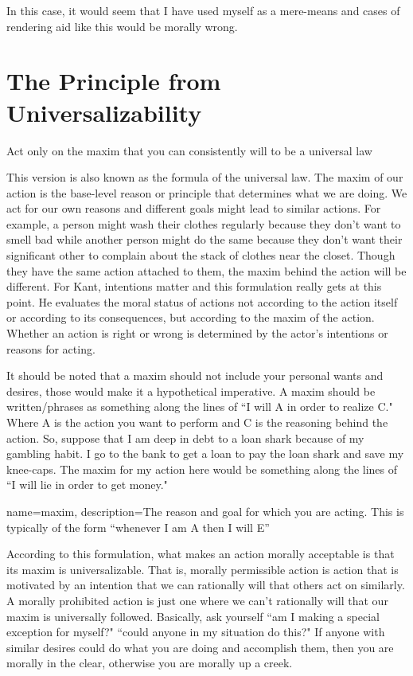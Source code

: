 In this case, it would seem that I have used myself as a mere-means and cases of rendering aid like this would be morally wrong.    
\section{The Principle from Universalizability}
\begin{center}
Act only on the maxim that you can consistently will to be a universal law
\end{center}
This version is also known as the formula of the universal law. The maxim of our action is the base-level reason or principle that determines what we are doing. We act for our own reasons and different goals might lead to similar actions. For example, a person might wash their clothes regularly because they don't want to smell bad while another person might do the same because they don't want their significant other to complain about the stack of clothes near the closet. Though they have the same action attached to them, the maxim behind the action will be different.  For Kant, intentions matter and this formulation really gets at this point. He evaluates the moral status of actions not according to the action itself or according to its consequences, but according to the maxim of the action. Whether an action is right or wrong  is determined by the actor’s intentions or reasons for acting.

It should be noted that a \gls{maxim} should not include your personal wants and desires, those would make it a hypothetical imperative. A maxim should be written/phrases as something along the lines of ``I will A in order to realize C." Where A is the action you want to perform and C is the reasoning behind the action. So, suppose that I am deep in debt to a loan shark because of my gambling habit. I go to the bank to get a loan to pay the loan shark and save my knee-caps. The maxim for my action here would be something along the lines of ``I will lie in order to get money."

{
  name=maxim,
  description={The reason and goal for which you are acting. This is typically of the form ``whenever I am A then I will E''}
}


According to this formulation, what makes an action morally acceptable is that its maxim is universalizable. That is, morally permissible action is action that is motivated by an intention that we can rationally will that others act on similarly. A morally prohibited action is just one where we can’t rationally will that our maxim is universally followed. Basically, ask yourself ``am I making a special exception for myself?" ``could anyone in my situation do this?" If anyone with similar desires could do what you are doing and accomplish them, then you are morally in the clear, otherwise you are morally up a creek.

